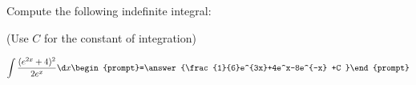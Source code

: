 \documentclass{ximera}
\author{Jim Talamo}
\begin{document}
\begin{exercise}
Compute the following indefinite integral:

\begin{prompt} (Use $C$ for the constant of integration) \end{prompt}
\[
\int \frac{(e^{2x}+4)^2}{2e^x}  \d x 
\begin{prompt}=\answer{\frac{1}{6}e^{3x}+4e^x-8e^{-x} +C }\end{prompt}
\]
\end{exercise}
\end{document}
